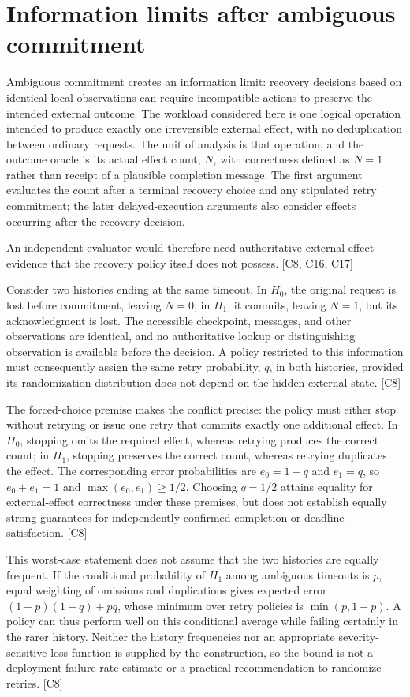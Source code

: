 \documentclass[11pt]{article}
\begin{document}
\section{Information limits after ambiguous commitment}
Ambiguous commitment creates an information limit: recovery decisions based on identical local observations can require incompatible actions to preserve the intended external outcome. The workload considered here is one logical operation intended to produce exactly one irreversible external effect, with no deduplication between ordinary requests. The unit of analysis is that operation, and the outcome oracle is its actual effect count, $N$, with correctness defined as $N=1$ rather than receipt of a plausible completion message. The first argument evaluates the count after a terminal recovery choice and any stipulated retry commitment; the later delayed-execution arguments also consider effects occurring after the recovery decision.

An independent evaluator would therefore need authoritative external-effect evidence that the recovery policy itself does not possess. [C8, C16, C17]

Consider two histories ending at the same timeout. In $H_0$, the original request is lost before commitment, leaving $N=0$; in $H_1$, it commits, leaving $N=1$, but its acknowledgment is lost. The accessible checkpoint, messages, and other observations are identical, and no authoritative lookup or distinguishing observation is available before the decision. A policy restricted to this information must consequently assign the same retry probability, $q$, in both histories, provided its randomization distribution does not depend on the hidden external state. [C8]

The forced-choice premise makes the conflict precise: the policy must either stop without retrying or issue one retry that commits exactly one additional effect. In $H_0$, stopping omits the required effect, whereas retrying produces the correct count; in $H_1$, stopping preserves the correct count, whereas retrying duplicates the effect. The corresponding error probabilities are $e_0=1-q$ and $e_1=q$, so $e_0+e_1=1$ and $\max(e_0,e_1)\geq 1/2$. Choosing $q=1/2$ attains equality for external-effect correctness under these premises, but does not establish equally strong guarantees for independently confirmed completion or deadline satisfaction. [C8]

This worst-case statement does not assume that the two histories are equally frequent. If the conditional probability of $H_1$ among ambiguous timeouts is $p$, equal weighting of omissions and duplications gives expected error $(1-p)(1-q)+pq$, whose minimum over retry policies is $\min(p,1-p)$. A policy can thus perform well on this conditional average while failing certainly in the rarer history. Neither the history frequencies nor an appropriate severity-sensitive loss function is supplied by the construction, so the bound is not a deployment failure-rate estimate or a practical recommendation to randomize retries. [C8]
\end{document}
